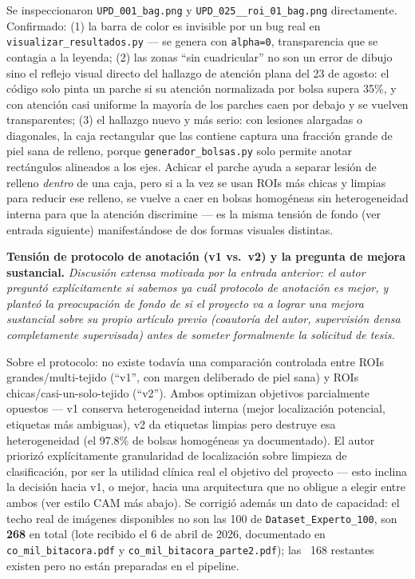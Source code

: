 \documentclass[12pt,letterpaper]{report}
\newcommand{\entrada}[2]{%
    \vspace{0.6em}
    \noindent\textbf{#1.} \textit{#2}
    \vspace{0.3em}
    \par
}
\begin{document}
Se inspeccionaron \texttt{UPD\_001\_bag.png} y \texttt{UPD\_025\_\_roi\_01\_bag.png} directamente.
Confirmado: (1) la barra de color es invisible por un bug real en \texttt{visualizar\_resultados.py}
--- se genera con \texttt{alpha=0}, transparencia que se contagia a la leyenda; (2) las zonas ``sin
cuadricular'' no son un error de dibujo sino el reflejo visual directo del hallazgo de atención plana
del 23 de agosto: el código solo pinta un parche si su atención normalizada por bolsa supera 35\%, y
con atención casi uniforme la mayoría de los parches caen por debajo y se vuelven transparentes; (3)
el hallazgo nuevo y más serio: con lesiones alargadas o diagonales, la caja rectangular que las
contiene captura una fracción grande de piel sana de relleno, porque \texttt{generador\_bolsas.py}
solo permite anotar rectángulos alineados a los ejes. Achicar el parche ayuda a separar lesión de
relleno \emph{dentro} de una caja, pero si a la vez se usan ROIs más chicas y limpias para reducir
ese relleno, se vuelve a caer en bolsas homogéneas sin heterogeneidad interna para que la atención
discrimine --- es la misma tensión de fondo (ver entrada siguiente) manifestándose de dos formas
visuales distintas.

\entrada{Tensión de protocolo de anotación (v1 vs.\ v2) y la pregunta de mejora sustancial}{Discusión
extensa motivada por la entrada anterior: el autor preguntó explícitamente si sabemos ya cuál
protocolo de anotación es mejor, y planteó la preocupación de fondo de si el proyecto va a lograr una
mejora sustancial sobre su propio artículo previo (coautoría del autor, supervisión densa
completamente supervisada) antes de someter formalmente la solicitud de tesis.}

Sobre el protocolo: no existe todavía una comparación controlada entre ROIs grandes/multi-tejido
(``v1'', con margen deliberado de piel sana) y ROIs chicas/casi-un-solo-tejido (``v2''). Ambos
optimizan objetivos parcialmente opuestos --- v1 conserva heterogeneidad interna (mejor localización
potencial, etiquetas más ambiguas), v2 da etiquetas limpias pero destruye esa heterogeneidad (el
97.8\% de bolsas homogéneas ya documentado). El autor priorizó explícitamente granularidad de
localización sobre limpieza de clasificación, por ser la utilidad clínica real el objetivo del
proyecto --- esto inclina la decisión hacia v1, o mejor, hacia una arquitectura que no obligue a
elegir entre ambos (ver estilo CAM más abajo). Se corrigió además un dato de capacidad: el techo real
de imágenes disponibles no son las 100 de \texttt{Dataset\_Experto\_100}, son \textbf{268} en total
(lote recibido el 6 de abril de 2026, documentado en \texttt{co\_mil\_bitacora.pdf} y
\texttt{co\_mil\_bitacora\_parte2.pdf}); las ~168 restantes existen pero no están preparadas en el
pipeline.
\end{document}
